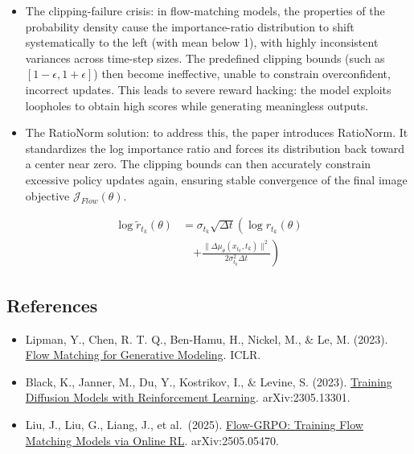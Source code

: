 \begin{itemize}
\item
  The clipping-failure crisis: in flow-matching models, the properties of the probability density cause the importance-ratio distribution to shift systematically to the left (with mean below 1), with highly inconsistent variances across time-step sizes. The predefined clipping bounds (such as \([1-\epsilon,1+\epsilon]\)) then become ineffective, unable to constrain overconfident, incorrect updates. This leads to severe reward hacking: the model exploits loopholes to obtain high scores while generating meaningless outputs.
\item
  The RatioNorm solution: to address this, the paper introduces RatioNorm. It standardizes the log importance ratio and forces its distribution back toward a center near zero. The clipping bounds can then accurately constrain excessive policy updates again, ensuring stable convergence of the final image objective \(\mathcal{J}_{Flow}(\theta)\).
\end{itemize}

\[
\begin{aligned}
\log \tilde{r}_{t_k}(\theta)
&=
\sigma_{t_k}\sqrt{\Delta t}
\left(
\log r_{t_k}(\theta)
\right.
\\
&\quad\left.
+\frac{\|\Delta\mu_\theta(x_{t_k},t_k)\|^2}{2\sigma_{t_k}^2\Delta t}
\right)
\end{aligned}
\]

\FloatBarrier
{}
\hypertarget{references-137}{%
\subsection{References}\label{references-137}}

\vspace{0.25em}
\begin{itemize}
\tightlist
\item
  Lipman, Y., Chen, R. T. Q., Ben-Hamu, H., Nickel, M., \& Le, M. (2023). \href{https://arxiv.org/abs/2210.02747}{Flow Matching for Generative Modeling}. ICLR.
\item
  Black, K., Janner, M., Du, Y., Kostrikov, I., \& Levine, S. (2023). \href{https://arxiv.org/abs/2305.13301}{Training Diffusion Models with Reinforcement Learning}. arXiv:2305.13301.
\item
  Liu, J., Liu, G., Liang, J., et al.~(2025). \href{https://arxiv.org/abs/2505.05470}{Flow-GRPO: Training Flow Matching Models via Online RL}. arXiv:2505.05470.
\end{itemize}

\clearpage
